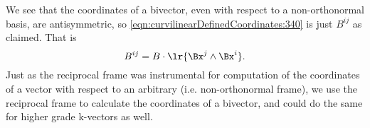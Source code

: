 We see that the coordinates of a bivector, even with respect to a non-orthonormal basis, are antisymmetric, so
\cref{eqn:curvilinearDefinedCoordinates:340} is just \( B^{ij} \) as claimed.  That is
\begin{equation}\label{eqn:curvilinearDefinedCoordinates:401}
B^{ij} = B \cdot \lr{ \Bx^{j} \wedge \Bx^{i} }.
\end{equation}
Just as the reciprocal frame was instrumental for computation of the coordinates of a vector with respect to an arbitrary (i.e. non-orthonormal frame), we use the reciprocal frame to calculate the coordinates of a bivector, and could do the same for higher grade k-vectors as well.
